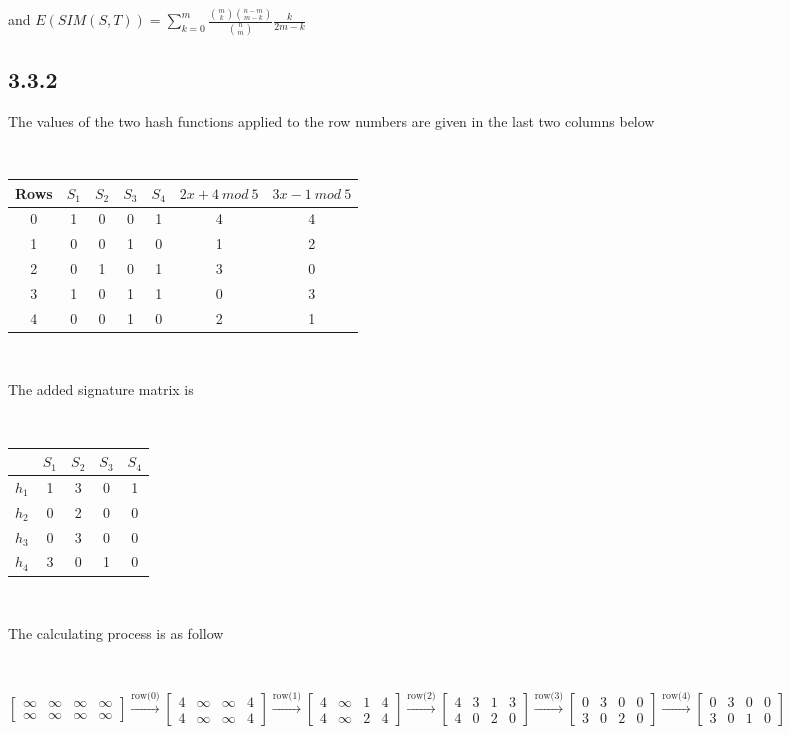 \documentclass[a4paper, 11pt]{article}
\begin{document}
and $E(SIM(S,T)) = \sum_{k=0}^m  \frac{\binom{m}{k}\binom{n - m}{m - k}}{\binom nm} \frac{k}{2m -k}$


\subsection*{3.3.2}

The values of the two hash functions applied to the row numbers are given in the last two columns below

\

\begin{tabular}{c|c|c|c|c|c|c} 
Rows & $S_1$ & $S_2$ & $S_3$ & $S_4$ & $2x + 4 \ mod \ 5$ & $3x - 1 \ mod \ 5$ \\ 
\hline 
0 & 1 & 0 & 0 & 1 & 4 & 4 \\ 
1 & 0 & 0 & 1 & 0 & 1 & 2 \\ 
2 & 0 & 1 & 0 & 1 & 3 & 0 \\ 
3 & 1 & 0 & 1 & 1 & 0 & 3 \\ 
4& 0 & 0 & 1 & 0 & 2 & 1 \\ 
\end{tabular} 

\

The added signature matrix is

\

\begin{tabular}{c|c|c|c|c} 
\ & $S_1$ & $S_2$ & $S_3$ & $S_4$ \\ 
\hline 
$h_1$ & 1 & 3 & 0 & 1  \\ 
$h_2$ & 0 & 2 & 0 & 0 \\
$h_3$ & 0 & 3 & 0 & 0 \\
$h_4$ & 3 & 0 & 1 & 0 \\
\end{tabular} 

\

The calculating process is as follow

\

$\begin{bmatrix}
\infty & \infty & \infty & \infty \\
\infty & \infty & \infty & \infty
\end{bmatrix} \xrightarrow{\text{row(0)}}
\begin{bmatrix}
4 & \infty & \infty & 4 \\
4 & \infty & \infty & 4
\end{bmatrix} \xrightarrow{\text{row(1)}}
\begin{bmatrix}
4 & \infty & 1 & 4 \\
4 & \infty & 2 & 4
\end{bmatrix} \xrightarrow{\text{row(2)}}
\begin{bmatrix}
4 & 3 & 1 & 3 \\
4 & 0 & 2 & 0
\end{bmatrix} \xrightarrow{\text{row(3)}}
\begin{bmatrix}
0 & 3 & 0 & 0 \\
3 & 0 & 2 & 0
\end{bmatrix} \xrightarrow{\text{row(4)}}
\begin{bmatrix}
0 & 3 & 0 & 0 \\
3 & 0 & 1 & 0
\end{bmatrix}
$
\end{document}
